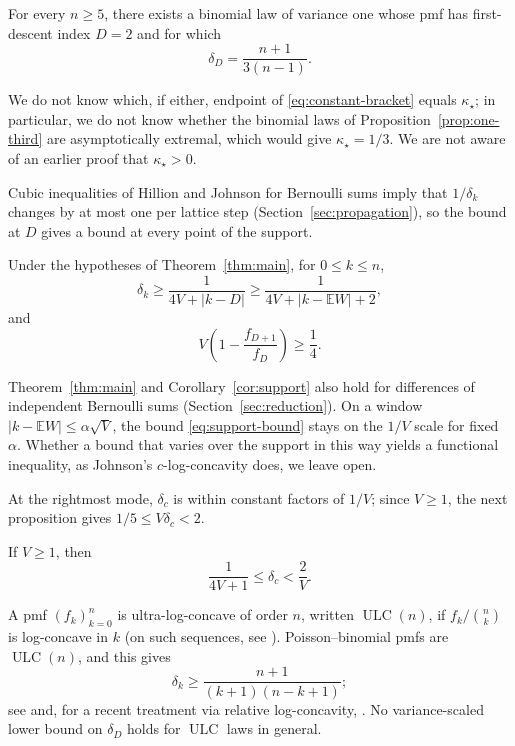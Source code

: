 \documentclass[ECP]{ejpecp}
\begin{document}
\begin{proposition}\label{prop:one-third}
  For every $n\geq5$, there exists a binomial law of variance one whose pmf has
  first-descent index $D=2$ and for which
  \[
    \delta_D=\frac{n+1}{3(n-1)}.
  \]
\end{proposition}

We do not know which, if either, endpoint of \eqref{eq:constant-bracket}
equals $\kappa_\star$; in particular, we do not know whether the binomial
laws of Proposition~\ref{prop:one-third} are asymptotically extremal, which
would give $\kappa_\star=1/3$. We are not aware of an earlier proof that
$\kappa_\star>0$.

Cubic inequalities of Hillion and Johnson \cite{hillionjohnson2016} for
Bernoulli sums imply that $1/\delta_k$ changes by at most one per lattice step
(Section~\ref{sec:propagation}), so the bound at $D$ gives a bound at every
point of the support.

\begin{corollary}\label{cor:support}
  Under the hypotheses of Theorem~\ref{thm:main}, for $0\leq k\leq n$,
  \begin{equation}\label{eq:support-bound}
    \delta_k\geq\frac1{4V+|k-D|}\geq\frac1{4V+|k-\mathbb EW|+2},
  \end{equation}
  and
  \begin{equation}\label{eq:adjacent-ratio-drop}
    V\left(1-\frac{f_{D+1}}{f_D}\right)\geq\frac14.
  \end{equation}
\end{corollary}

Theorem~\ref{thm:main} and Corollary~\ref{cor:support} also hold for
differences of independent Bernoulli sums (Section~\ref{sec:reduction}).
On a window $|k-\mathbb EW|\leq\alpha\sqrt V$, the bound
\eqref{eq:support-bound} stays on the $1/V$ scale for fixed $\alpha$.
Whether a bound that varies over the support in this way yields a functional
inequality, as Johnson's $c$-log-concavity does, we leave open.

At the rightmost mode, $\delta_c$ is within constant factors of $1/V$; since
$V\geq1$, the next proposition gives $1/5\leq V\delta_c<2$.

\begin{proposition}\label{prop:mode}
  If $V\geq1$, then
  \[
    \frac1{4V+1}\leq\delta_c<\frac2V.
  \]
\end{proposition}

A pmf $(f_k)_{k=0}^n$ is ultra-log-concave of order $n$, written
$\operatorname{ULC}(n)$, if $f_k/\binom nk$ is log-concave in $k$ (on such
sequences, see \cite{liggett1997}).
Poisson--binomial pmfs are $\operatorname{ULC}(n)$, and this gives
\begin{equation}\label{eq:ulc}
  \delta_k\geq
  \frac{n+1}{(k+1)(n-k+1)};
\end{equation}
see \cite[Definition~3.11 and equation~(41)]{hillionjohnson2016} and, for a
recent treatment via relative log-concavity,
\cite[the discussion following Definition~1.3]{marsigliettimelbourne2026}.
No variance-scaled lower bound on $\delta_D$ holds for $\operatorname{ULC}$
laws in general.
\end{document}

